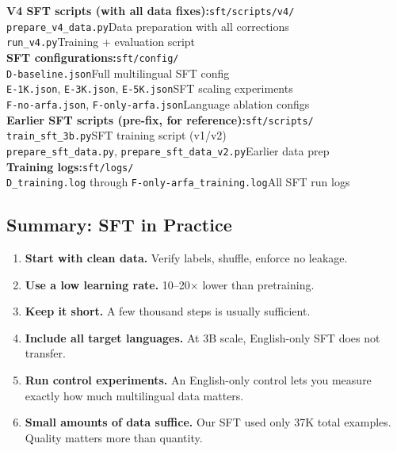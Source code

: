 \documentclass[11pt,a4paper]{article}
\begin{document}
\begin{reporef}
\textbf{V4 SFT scripts (with all data fixes):}\hfill\texttt{sft/scripts/v4/}\\
\quad\texttt{prepare\_v4\_data.py}\hfill Data preparation with all corrections\\
\quad\texttt{run\_v4.py}\hfill Training + evaluation script\\
[4pt]
\textbf{SFT configurations:}\hfill\texttt{sft/config/}\\
\quad\texttt{D-baseline.json}\hfill Full multilingual SFT config\\
\quad\texttt{E-1K.json}, \texttt{E-3K.json}, \texttt{E-5K.json}\hfill SFT scaling experiments\\
\quad\texttt{F-no-arfa.json}, \texttt{F-only-arfa.json}\hfill Language ablation configs\\
[4pt]
\textbf{Earlier SFT scripts (pre-fix, for reference):}\hfill\texttt{sft/scripts/}\\
\quad\texttt{train\_sft\_3b.py}\hfill SFT training script (v1/v2)\\
\quad\texttt{prepare\_sft\_data.py}, \texttt{prepare\_sft\_data\_v2.py}\hfill Earlier data prep\\
[4pt]
\textbf{Training logs:}\hfill\texttt{sft/logs/}\\
\quad\texttt{D\_training.log} through \texttt{F-only-arfa\_training.log}\hfill All SFT run logs\\
\end{reporef}

\subsection{Summary: SFT in Practice}

\begin{enumerate}
    \item \textbf{Start with clean data.} Verify labels, shuffle, enforce no leakage.
    \item \textbf{Use a low learning rate.} 10--20$\times$ lower than pretraining.
    \item \textbf{Keep it short.} A few thousand steps is usually sufficient.
    \item \textbf{Include all target languages.} At 3B scale, English-only SFT does not transfer.
    \item \textbf{Run control experiments.} An English-only control lets you measure exactly how much multilingual data matters.
    \item \textbf{Small amounts of data suffice.} Our SFT used only 37K total examples. Quality matters more than quantity.
\end{enumerate}
\end{document}
